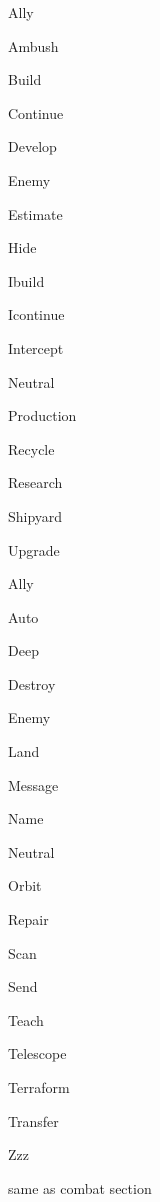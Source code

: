 \documentclass[10pt,titlepage]{article}
\begin{document}
\begin{description}
    \item[Production section:]
  \setlength{\itemsep}{1pt}
  \setlength{\parskip}{0pt}
  \setlength{\parsep}{0pt}
	\item Ally
	\item Ambush
	\item Build
	\item Continue
	\item Develop
	\item Enemy
	\item Estimate
	\item Hide
	\item Ibuild
	\item Icontinue
	\item Intercept
	\item Neutral
	\item Production
	\item Recycle
	\item Research
	\item Shipyard
	\item Upgrade
\end{description}
\begin{description}
 \item[Post-arrival section:]
  \setlength{\itemsep}{1pt}
  \setlength{\parskip}{0pt}
  \setlength{\parsep}{0pt}
	\item Ally
	\item Auto
	\item Deep
	\item Destroy
	\item Enemy
	\item Land
	\item Message
	\item Name
	\item Neutral
	\item Orbit
	\item Repair
	\item Scan
	\item Send
	\item Teach
	\item Telescope
	\item Terraform
	\item Transfer
	\item Zzz
\end{description}
\begin{description}
 \item [Strike section:]
  \setlength{\itemsep}{1pt}
  \setlength{\parskip}{0pt}
  \setlength{\parsep}{0pt}
\item same as combat section
\end{description}
\end{document}
